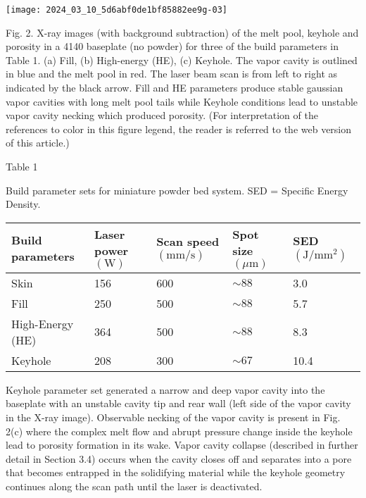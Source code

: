 \documentclass[10pt]{article}
\begin{document}
\begin{center}
\texttt{[image: 2024\_03\_10\_5d6abf0de1bf85882ee9g-03]}
\end{center}

Fig. 2. X-ray images (with background subtraction) of the melt pool, keyhole and porosity in a 4140 baseplate (no powder) for three of the build parameters in Table 1. (a) Fill, (b) High-energy (HE), (c) Keyhole. The vapor cavity is outlined in blue and the melt pool in red. The laser beam scan is from left to right as indicated by the black arrow. Fill and HE parameters produce stable gaussian vapor cavities with long melt pool tails while Keyhole conditions lead to unstable vapor cavity necking which produced porosity. (For interpretation of the references to color in this figure legend, the reader is referred to the web version of this article.)

Table 1

Build parameter sets for miniature powder bed system. SED = Specific Energy Density.

\begin{center}
\begin{tabular}{lllll}
\hline
Build parameters & Laser power $(\mathrm{W})$ & Scan speed $(\mathrm{mm} / \mathrm{s})$ & Spot size $(\mu \mathrm{m})$ & SED $\left(\mathrm{J} / \mathrm{mm}^{2}\right)$ \\
\hline
Skin & 156 & 600 & $\sim 88$ & 3.0 \\
Fill & 250 & 500 & $\sim 88$ & 5.7 \\
High-Energy (HE) & 364 & 500 & $\sim 88$ & 8.3 \\
Keyhole & 208 & 300 & $\sim 67$ & 10.4 \\
\hline
\end{tabular}
\end{center}

Keyhole parameter set generated a narrow and deep vapor cavity into the baseplate with an unstable cavity tip and rear wall (left side of the vapor cavity in the $\mathrm{X}$-ray image). Observable necking of the vapor cavity is present in Fig. 2(c) where the complex melt flow and abrupt pressure change inside the keyhole lead to porosity formation in its wake. Vapor cavity collapse (described in further detail in Section 3.4) occurs when the cavity closes off and separates into a pore that becomes entrapped in the solidifying material while the keyhole geometry continues along the scan path until the laser is deactivated.
\end{document}
